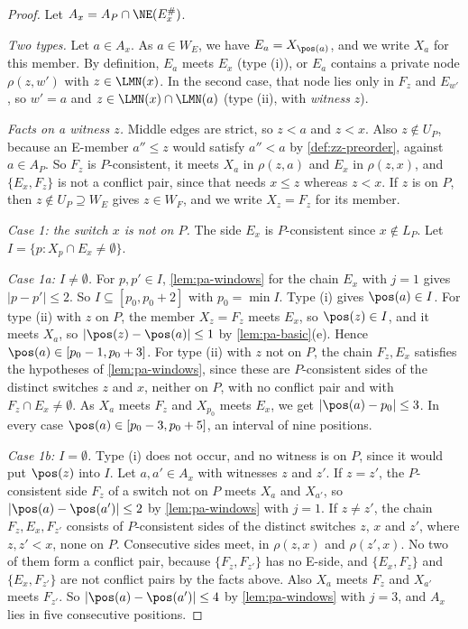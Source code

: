 \begin{proof}
Let $A_x = A_P \cap \NE(E^\#_x)$.

\emph{Two types.}
Let $a \in A_x$.
As $a \in W_E$, we have $E_a = X_{\pos(a)}$, and we write $X_a$ for this member.
By definition, $E_a$ meets $E_x$ (type (i)), or $E_a$ contains a private node $\rho(z, w')$ with $z \in \LMN(x)$.
In the second case, that node lies only in $F_z$ and $E_{w'}$, so $w' = a$ and $z \in \LMN(x) \cap \LMN(a)$ (type (ii), with \emph{witness} $z$).

\emph{Facts on a witness $z$.}
Middle edges are strict, so $z < a$ and $z < x$.
Also $z \notin U_P$, because an E-member $a'' \leq z$ would satisfy $a'' < a$ by \cref{def:zz-preorder}, against $a \in A_P$.
So $F_z$ is $P$-consistent, it meets $X_a$ in $\rho(z, a)$ and $E_x$ in $\rho(z, x)$, and $\{E_x, F_z\}$ is not a conflict pair, since that needs $x \leq z$ whereas $z < x$.
If $z$ is on $P$, then $z \notin U_P \supseteq W_E$ gives $z \in W_F$, and we write $X_z = F_z$ for its member.

\emph{Case 1: the switch $x$ is not on $P$.}
The side $E_x$ is $P$-consistent since $x \notin L_P$.
Let $I = \{p : X_p \cap E_x \neq \emptyset\}$.

\emph{Case 1a: $I \neq \emptyset$.}
For $p, p' \in I$, \cref{lem:pa-windows} for the chain $E_x$ with $j = 1$ gives $|p - p'| \leq 2$.
So $I \subseteq [p_0, p_0 + 2]$ with $p_0 = \min I$.
Type (i) gives $\pos(a) \in I$.
For type (ii) with $z$ on $P$, the member $X_z = F_z$ meets $E_x$, so $\pos(z) \in I$, and it meets $X_a$, so $|\pos(z) - \pos(a)| \leq 1$ by \cref{lem:pa-basic}(e).
Hence $\pos(a) \in [p_0 - 1, p_0 + 3]$.
For type (ii) with $z$ not on $P$, the chain $F_z, E_x$ satisfies the hypotheses of \cref{lem:pa-windows}, since these are $P$-consistent sides of the distinct switches $z$ and $x$, neither on $P$, with no conflict pair and with $F_z \cap E_x \neq \emptyset$.
As $X_a$ meets $F_z$ and $X_{p_0}$ meets $E_x$, we get $|\pos(a) - p_0| \leq 3$.
In every case $\pos(a) \in [p_0 - 3, p_0 + 5]$, an interval of nine positions.

\emph{Case 1b: $I = \emptyset$.}
Type (i) does not occur, and no witness is on $P$, since it would put $\pos(z)$ into $I$.
Let $a, a' \in A_x$ with witnesses $z$ and $z'$.
If $z = z'$, the $P$-consistent side $F_z$ of a switch not on $P$ meets $X_a$ and $X_{a'}$, so $|\pos(a) - \pos(a')| \leq 2$ by \cref{lem:pa-windows} with $j = 1$.
If $z \neq z'$, the chain $F_z, E_x, F_{z'}$ consists of $P$-consistent sides of the distinct switches $z$, $x$ and $z'$, where $z, z' < x$, none on $P$.
Consecutive sides meet, in $\rho(z, x)$ and $\rho(z', x)$.
No two of them form a conflict pair, because $\{F_z, F_{z'}\}$ has no E-side, and $\{E_x, F_z\}$ and $\{E_x, F_{z'}\}$ are not conflict pairs by the facts above.
Also $X_a$ meets $F_z$ and $X_{a'}$ meets $F_{z'}$.
So $|\pos(a) - \pos(a')| \leq 4$ by \cref{lem:pa-windows} with $j = 3$, and $A_x$ lies in five consecutive positions.


\end{proof}

